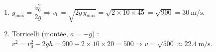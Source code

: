 \documentclass[11pt,a4paper]{article}
\begin{document}
\begin{corrige}
\begin{enumerate}[label=\alph*)]
  \item $y_{\max}=\dfrac{v_0^2}{2g}\Rightarrow v_0=\sqrt{2g\,y_{\max}}=\sqrt{2\times10\times45}=\sqrt{900}=\qty{30}{\metre\per\second}$.
  \item Torricelli (montée, $a=-g$) : $v^2=v_0^2-2g h=900-2\times10\times20=500 \Rightarrow v=\sqrt{500}\approx\qty{22,4}{\metre\per\second}$.
\end{enumerate}
\end{corrige}
\end{document}
